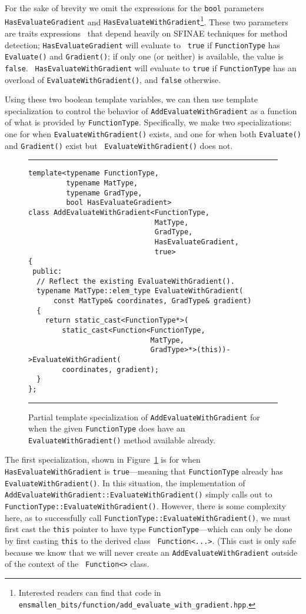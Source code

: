 For the sake of brevity we omit the expressions for the {\tt bool} parameters
{\tt HasEvaluateGradient} and {\tt HasEvaluateWithGradient}\footnote{Interested
readers can find that code in {\tt
ensmallen\_bits/function/add\_evaluate\_with\_gradient.hpp}.}.  These two
parameters are traits expressions~\cite{TODO} that depend heavily on SFINAE
techniques for method detection; {\tt HasEvaluateGradient} will evaluate to {\tt
true} if {\tt FunctionType} has {\tt Evaluate()} and {\tt Gradient()}; if only
one (or neither) is available, the value is {\tt false}.  {\tt
HasEvaluateWithGradient} will evaluate to {\tt true} if {\tt FunctionType} has
an overload of {\tt EvaluateWithGradient()}, and {\tt false} otherwise.

Using these two boolean template variables, we can then use template
specialization to control the behavior of {\tt AddEvaluateWithGradient} as a
function of what is provided by {\tt FunctionType}.  Specifically, we make two
specializations: one for when {\tt EvaluateWithGradient()} exists, and one for
when both {\tt Evaluate()} and {\tt Gradient()} exist but {\tt
EvaluateWithGradient()} does not.

\begin{figure}[t!]
\hrule
\vspace{1ex}
\begin{verbatim}
template<typename FunctionType,
         typename MatType,
         typename GradType,
         bool HasEvaluateGradient>
class AddEvaluateWithGradient<FunctionType,
                              MatType,
                              GradType,
                              HasEvaluateGradient,
                              true>
{
 public:
  // Reflect the existing EvaluateWithGradient().
  typename MatType::elem_type EvaluateWithGradient(
      const MatType& coordinates, GradType& gradient)
  {
    return static_cast<FunctionType*>(
        static_cast<Function<FunctionType,
                             MatType,
                             GradType>*>(this))->EvaluateWithGradient(
        coordinates, gradient);
  }
};
\end{verbatim}
\hrule
\vspace*{-0.5em}
\caption{Partial template specialization of {\tt AddEvaluateWithGradient} for
when the given {\tt FunctionType} does have an {\tt EvaluateWithGradient()}
method available already.}
\label{fig:aewg-s1}
\end{figure}

The first specialization, shown in Figure~\ref{fig:aewg-s1} is for when {\tt
HasEvaluateWithGradient} is {\tt true}---meaning that {\tt FunctionType} already
has {\tt EvaluateWithGradient()}.  In this situation, the implementation of {\tt
AddEvaluateWithGradient::EvaluateWithGradient()} simply calls out to {\tt
FunctionType::EvaluateWithGradient()}.  However, there is some complexity here,
as to successfully call {\tt FunctionType::EvaluateWithGradient()}, we must
first cast the {\tt this} pointer to have type {\tt FunctionType}---which can
only be done by first casting {\tt this} to the derived class {\tt
Function<...>}.  (This cast is only safe because we know that we will never
create an {\tt AddEvaluateWithGradient} outside of the context of the {\tt
Function<>} class.

